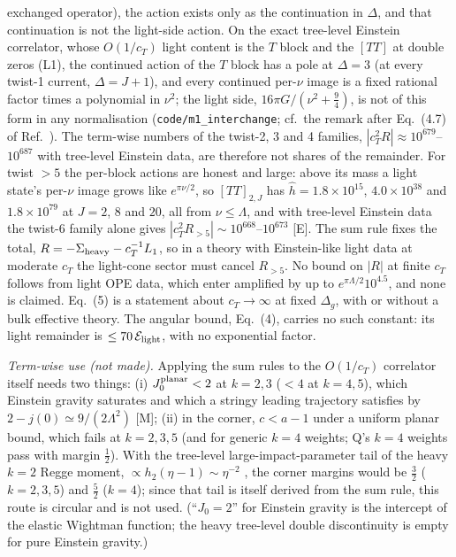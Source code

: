 \documentclass[aps,prl,onecolumn,superscriptaddress,nofootinbib]{revtex4-2}
\begin{document}
exchanged operator), the action exists only as the continuation in $\Delta$, and that continuation is not the light-side action. On the exact
tree-level Einstein correlator, whose $O(1/c_T)$ light content is the $T$ block and the $[TT]$ at double zeros (L1), the continued action of the
$T$ block has a pole at $\Delta=3$ (at every twist-1 current, $\Delta=J+1$), and every continued per-$\nu$ image is a fixed rational factor times a
polynomial in $\nu^2$; the light side, $16\pi G/(\nu^2+\tfrac94)$, is not of this form in any normalisation (\texttt{code/m1\_interchange}; cf.\ the
remark after Eq.~(4.7) of Ref.~\cite{CHMRS}). The term-wise numbers of the twist-2, 3 and 4 families, $|c_T^2R|\approx10^{679}$--$10^{687}$ with
tree-level Einstein data, are therefore not shares of the remainder. For twist $>5$ the per-block actions are honest and large: above its mass a
light state's per-$\nu$ image grows like $e^{\pi\nu/2}$, so $[TT]_{2,J}$ has $\hat h=1.8\times10^{15}$, $4.0\times10^{38}$ and $1.8\times10^{79}$ at
$J=2$, $8$ and $20$, all from $\nu\le\Lambda$, and with tree-level Einstein data the twist-6 family alone gives $|c_T^2R_{>5}|\sim10^{668}$--$10^{673}$ [E].
The sum rule fixes the total, $R=-\Sigma_{\rm heavy}-c_T^{-1}L_1$, so in a theory with Einstein-like light data at moderate $c_T$ the light-cone
sector must cancel $R_{>5}$. No bound on $|R|$ at finite $c_T$ follows from light OPE data, which enter amplified by up to $e^{\pi\Lambda/2}10^{4.5}$,
and none is claimed. Eq.~(5) is a statement about $c_T\to\infty$ at fixed $\Delta_g$, with or without a bulk effective theory. The angular bound,
Eq.~(4), carries no such constant: its light remainder is $\le70\,\mathcal E_{\rm light}$, with no exponential factor.

\emph{Term-wise use (not made).} Applying the sum rules to the $O(1/c_T)$ correlator itself needs two things:
(i) $J_0^{\rm planar}<2$ at $k=2,3$ ($<4$ at $k=4,5$), which Einstein gravity saturates \cite[eq.~(4.80)]{KKSDZ} and which a stringy
leading trajectory satisfies by $2-j(0)\simeq9/(2\Lambda^2)$ [M];
(ii) in the corner, $c<a-1$ under a uniform planar bound, which fails at $k=2,3,5$ (and for generic $k=4$ weights; Q's $k=4$ weights
pass with margin $\tfrac12$).
With the tree-level large-impact-parameter tail of the heavy $k=2$ Regge moment, $\propto h_2(\eta-1)\sim\eta^{-2}$
\cite[eq.~(4.45)]{CHMRS}, the corner margins would be $\tfrac32$ ($k=2,3,5$) and $\tfrac52$ ($k=4$); since that tail is itself derived
from the sum rule, this route is circular and is not used. (``$J_0=2$'' for Einstein gravity is the intercept of the elastic
Wightman function; the heavy tree-level double discontinuity is empty for pure Einstein gravity.)
\end{document}
